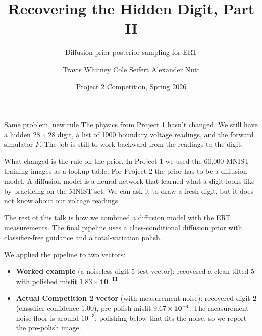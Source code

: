 \documentclass[aspectratio=169,10pt]{beamer}
\title{\textbf{Recovering the Hidden Digit, Part II}}
\subtitle{Diffusion-prior posterior sampling for ERT}
\author{Travis Whitney \quad Cole Seifert \quad Alexander Nutt}
\institute{AI 539, Oregon State University}
\date{Project 2 Competition, Spring 2026}
\begin{document}
\begin{frame}
  \titlepage
\end{frame}

\begin{frame}{Same problem, new rule}
The physics from Project 1 hasn't changed. We still have a hidden
$28 \times 28$ digit, a list of 1900 boundary voltage readings, and
the forward simulator $F$. The job is still to work backward from the
readings to the digit.

\vspace{0.6em}
What changed is the rule on the prior. In Project 1 we used the 60{,}000
MNIST training images as a lookup table. For Project 2 the prior has to
be a diffusion model. A diffusion model is a neural network that learned
what a digit looks like by practicing on the MNIST set. We can ask it to
draw a fresh digit, but it does not know about our voltage readings.

\vspace{0.6em}
The rest of this talk is how we combined a diffusion model with the ERT
measurements. The final pipeline uses a class-conditional diffusion
prior with classifier-free guidance and a total-variation polish.

\vspace{0.3em}
We applied the pipeline to two vectors:
\begin{itemize}\itemsep=2pt
\item \textbf{Worked example} (a noiseless digit-5 test vector):
  recovered a clean tilted 5 with polished misfit
  \textcolor{osuorange}{$\mathbf{1.83 \times 10^{-11}}$}.
\item \textbf{Actual Competition 2 vector} (with measurement noise):
  recovered digit \textbf{2} (classifier confidence $1.00$), pre-polish
  misfit \textcolor{osuorange}{$\mathbf{9.67 \times 10^{-4}}$}. The
  measurement noise floor is around $10^{-3}$; polishing below that
  fits the noise, so we report the pre-polish image.
\end{itemize}
\end{frame}
\end{document}
